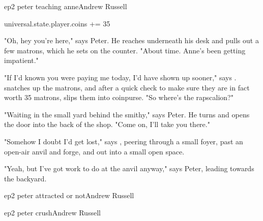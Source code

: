 \documentclass{book}
\begin{document}
\begin{childnode}{ep2 peter teaching anne}{Andrew Russell}

    \begin{code}

        universal.state.player.coins += 35

    \end{code}

    "Oh, hey you're here," says Peter. He reaches underneath his desk and pulls out a few matrons, which he sets on the counter. "About time. Anne's been getting impatient."

    "If I'd known you were paying me today, I'd have shown up sooner," says \name{}. \HeShe{} snatches up the matrons, and after a quick check to make sure they are in fact worth 35 matrons, slips them into \hisher{} coinpurse. "So where's the rapscalion?"

    "Waiting in the small yard behind the smithy," says Peter. He turns and opens the door into the back of the shop. "Come on, I'll take you there."

    "Somehow I doubt I'd get lost," says \name{}, peering through a small foyer, past an open-air anvil and forge, and out into a small open space. 

    "Yeah, but I've got work to do at the anvil anyway," says Peter, leading \name{} towards the backyard. 



\end{childnode}

\begin{childnode}{ep2 peter attracted or not}{Andrew Russell} 



\end{childnode}

\begin{childnode}{ep2 peter crush}{Andrew Russell}



\end{childnode}
\end{document}
